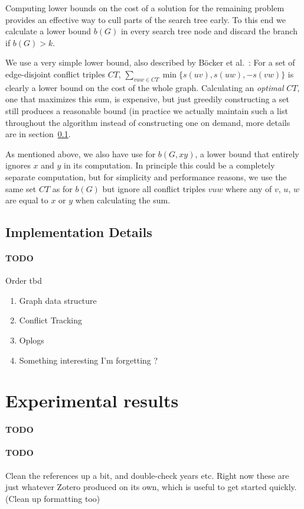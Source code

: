 \documentclass{article}
\newcommand{\todo}[1]{\paragraph{TODO} #1}
\theoremstyle{definition}
\begin{document}
Computing lower bounds on the cost of a solution for the remaining problem provides an effective way
to cull parts of the search tree early. To this end we calculate a lower bound $b(G)$ in every
search tree node and discard the branch if $b(G) > k$.

We use a very simple lower bound, also described by Böcker et al.~\cite{ExactAlgos}: For a set of
edge-disjoint conflict triples $CT$, $\sum_{vuw \in CT} \min\{s(uv), s(uw), -s(vw)\}$ is clearly a
lower bound on the cost of the whole graph. Calculating an \emph{optimal} $CT$, one that maximizes
this sum, is expensive, but just greedily constructing a set still produces a reasonable bound (in
practice we actually maintain such a list throughout the algorithm instead of constructing one on
demand, more details are in section~\ref{ImplDetails}.

As mentioned above, we also have use for $b(G, xy)$, a lower bound that entirely ignores $x$ and $y$
in its computation. In principle this could be a completely separate computation, but for simplicity
and performance reasons, we use the same set $CT$ as for $b(G)$ but ignore all conflict triples $vuw$
where any of $v$, $u$, $w$ are equal to $x$ or $y$ when calculating the sum.

\subsection{Implementation Details} \label {ImplDetails}

\todo Order tbd
\begin{enumerate}
	\item Graph data structure
	\item Conflict Tracking
	\item Oplogs
	\item Something interesting I'm forgetting ?
\end{enumerate}


\section{Experimental results}

\todo

\todo Clean the references up a bit, and double-check years etc. Right now these are just whatever
Zotero produced on its own, which is useful to get started quickly. (Clean up formatting too)
\end{document}
